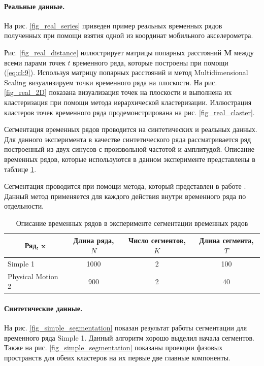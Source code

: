 \paragraph{Реальные данные.}

На рис. \ref{fig_real_series} приведен пример реальных временных рядов полученных при помощи взятия одной из координат мобильного акселерометра. 

Рис. \ref{fig_real_distance} иллюстрирует матрицы попарных расстояний $\textbf{M}$ между всеми парами точек $t$ временного ряда, которые построены при помощи (\ref{eq:cl:9}). 
Используя матрицу попарных расстояний и метод Multidimensional Scaling \cite{Borg2005} визуализируем точки временного ряда на плоскости. 
На рис. \ref{fig_real_2D} показана визуализация точек на плоскости и выполнена их кластеризация при помощи метода иерархической кластеризации. 
Иллюстрация кластеров точек временного ряда продемонстрирована на рис. \ref{fig_real_claster}.

Сегментация временных рядов проводится на синтетических и реальных данных. Для данного эксперимента в качестве синтетического ряда рассматривается ряд построенный из двух синусов с произвольной частотой и амплитудой. Описание временных рядов, которые используются в данном эксперименте представлены в таблице \ref{table:3}.

Сегментация проводится при помощи метода, который представлен в работе \cite{motrenko2015}. Данный метод применяется для каждого действия внутри временного ряда по отдельности.


\begin{table}[h!t]
\begin{center}
\caption{Описание временных рядов в эксперименте сегментации временных рядов}
\label{table:3}
\begin{tabular}{|c|c|c|c|}
\hline
	Ряд, $\textbf{x}$ &Длина ряда, $N$& Число сегментов, $K$&Длина сегмента, $T$\\
	\hline
	\multicolumn{1}{|l|}{Simple 1}
	& 1000& 2& 100\\
	\hline
	\multicolumn{1}{|l|}{Physical Motion 2}
	& 900& 2& 40\\
\hline

\end{tabular}
\end{center}
\end{table}

\paragraph{Синтетические данные.} На рис. \ref{fig_simple_segmentation} показан результат работы сегментации для временного ряда Simple 1. 
Данный алгоритм хорошо выделил начала сегментов. 
Также на рис. \ref{fig_simple_segmentation} показаны проекции фазовых пространств для обеих кластеров на их первые две главные компоненты.

